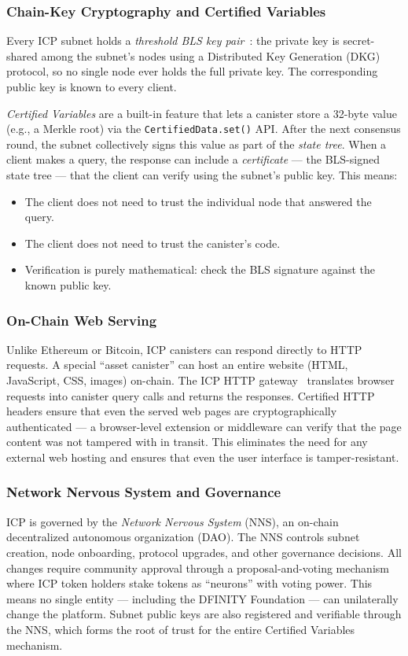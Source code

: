 \documentclass[journal]{IEEEtran}
\begin{document}
\subsubsection{Chain-Key Cryptography and Certified Variables}
Every ICP subnet holds a \emph{threshold BLS key pair}~\cite{boneh2001bls}: the private key is secret-shared among the subnet's nodes using a Distributed Key Generation (DKG) protocol, so no single node ever holds the full private key. The corresponding public key is known to every client.

\emph{Certified Variables} are a built-in feature that lets a canister store a 32-byte value (e.g., a Merkle root) via the \texttt{CertifiedData.set()} API. After the next consensus round, the subnet collectively signs this value as part of the \emph{state tree}. When a client makes a query, the response can include a \emph{certificate} — the BLS-signed state tree — that the client can verify using the subnet's public key. This means:
\begin{itemize}[leftmargin=*]
  \item The client does not need to trust the individual node that answered the query.
  \item The client does not need to trust the canister's code.
  \item Verification is purely mathematical: check the BLS signature against the known public key.
\end{itemize}

\subsubsection{On-Chain Web Serving}
Unlike Ethereum or Bitcoin, ICP canisters can respond directly to HTTP requests. A special ``asset canister'' can host an entire website (HTML, JavaScript, CSS, images) on-chain. The ICP HTTP gateway~\cite{dfinity2023httpgateway} translates browser requests into canister query calls and returns the responses. Certified HTTP headers ensure that even the served web pages are cryptographically authenticated — a browser-level extension or middleware can verify that the page content was not tampered with in transit. This eliminates the need for any external web hosting and ensures that even the user interface is tamper-resistant.

\subsubsection{Network Nervous System and Governance}
ICP is governed by the \emph{Network Nervous System} (NNS), an on-chain decentralized autonomous organization (DAO). The NNS controls subnet creation, node onboarding, protocol upgrades, and other governance decisions. All changes require community approval through a proposal-and-voting mechanism where ICP token holders stake tokens as ``neurons'' with voting power. This means no single entity — including the DFINITY Foundation — can unilaterally change the platform. Subnet public keys are also registered and verifiable through the NNS, which forms the root of trust for the entire Certified Variables mechanism.
\end{document}
